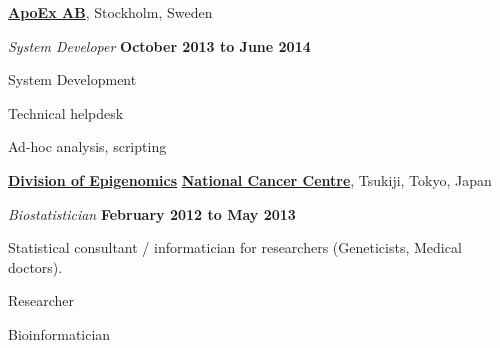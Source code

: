\halfblankline

\href{http://www.apoex.se}{\textbf{ApoEx AB}}, Stockholm, Sweden
\begin{outerlist}
\item[] \textit{System Developer}%
    \hfill \textbf{October 2013 to June 2014}
\begin{innerlist}
\item System Development
\item Technical helpdesk
\item Ad-hoc analysis, scripting
\end{innerlist}
\end{outerlist}

\halfblankline

\href{http://www.ncc.go.jp/en/nccri/divisions/14carc/14carc.html}{\textbf{Division of Epigenomics}}
\href{http://www.ncc.go.jp/}{\textbf{National Cancer Centre}}, Tsukiji, Tokyo, Japan
\begin{outerlist}
\item[] \textit{Biostatistician}%
	\hfill \textbf{February 2012 to May 2013}
\begin{innerlist}
\item Statistical consultant / informatician for researchers (Geneticists, Medical doctors).
\item Researcher
\item Bioinformatician
\end{innerlist}
\end{outerlist}

\halfblankline

